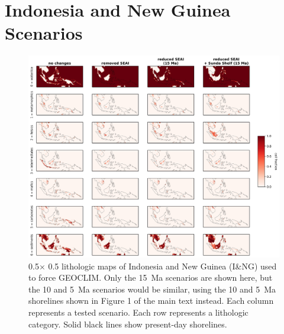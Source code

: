 \documentclass[11pt,letterpaper]{article}
\newcommand{\degrees}{\textdegree\xspace}
\begin{document}
\section*{Indonesia and New Guinea Scenarios}

\begin{figure}[h!]
    \centering
    \includegraphics[width=1\textwidth]{Manuscript/Figures/ING_fracs.jpg}
    \caption{0.5\degrees $\times$ 0.5\degrees lithologic maps of Indonesia and New Guinea (I\&NG) used to force GEOCLIM. Only the 15~Ma scenarios are shown here, but the 10 and 5~Ma scenarios would be similar, using the 10 and 5~Ma shorelines shown in Figure 1 of the main text instead. Each column represents a tested scenario. Each row represents a lithologic category. Solid black lines show present-day shorelines.}
    \label{fig:ING_fracs}
\end{figure}
\end{document}
